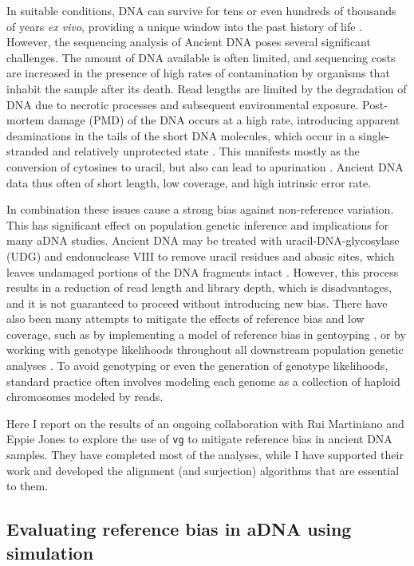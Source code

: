 In suitable conditions, DNA can survive for tens or even hundreds of thousands of years \emph{ex vivo}, providing a unique window into the past history of life \cite{dabney2013ancient}.
However, the sequencing analysis of Ancient DNA poses several significant challenges.
The amount of DNA available is often limited, and sequencing costs are increased in the presence of high rates of contamination by organisms that inhabit the sample after its death.
Read lengths are limited by the degradation of DNA due to necrotic processes and subsequent environmental exposure.
Post-mortem damage (PMD) of the DNA occurs at a high rate, introducing apparent deaminations in the tails of the short DNA molecules, which occur in a single-stranded and relatively unprotected state \cite{link2017atlas}.
This manifests mostly as the conversion of cytosines to uracil, but also can lead to apurination \cite{dabney2013ancient}.
Ancient DNA data thus often of short length, low coverage, and high intrinsic error rate.

In combination these issues cause a strong bias against non-reference variation.
This has significant effect on population genetic inference and implications for many aDNA studies.
Ancient DNA may be treated with uracil-DNA-glycosylase (UDG) and endonuclease VIII to remove uracil residues and abasic sites, which leaves undamaged portions of the DNA fragments intact \cite{briggs2009removal}.
However, this process results in a reduction of read length and library depth, which is disadvantages, and it is not guaranteed to proceed without introducing new bias.
There have also been many attempts to mitigate the effects of reference bias and low coverage, such as by implementing a model of reference bias in gentoyping \cite{pruefer2018snpad}, or by working with genotype likelihoods throughout all downstream population genetic analyses \cite{link2017atlas}.
To avoid genotyping or even the generation of genotype likelihoods, standard practice often involves modeling each genome as a collection of haploid chromosomes modeled by reads.

Here I report on the results of an ongoing collaboration with Rui Martiniano and Eppie Jones to explore the use of {\tt vg} to mitigate reference bias in ancient DNA samples.
They have completed most of the analyses, while I have supported their work and developed the alignment (and surjection) algorithms that are essential to them.

\subsection{Evaluating reference bias in aDNA using simulation}

